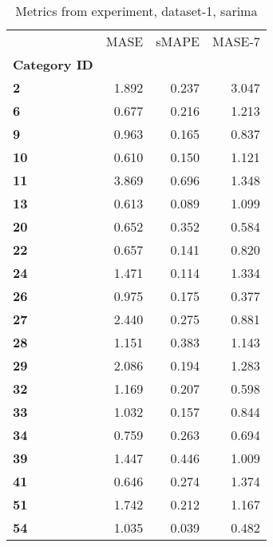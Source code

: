 \begin{table}[h]
\centering
\caption{Metrics from experiment, dataset-1, sarima}
\label{table:sarima-dataset-1}
\begin{tabular}{lrrr}
\toprule
{} &   MASE &  sMAPE &  MASE-7 \\
\textbf{Category ID} &        &        &         \\
\midrule
\textbf{2          } &  1.892 &  0.237 &   3.047 \\
\textbf{6          } &  0.677 &  0.216 &   1.213 \\
\textbf{9          } &  0.963 &  0.165 &   0.837 \\
\textbf{10         } &  0.610 &  0.150 &   1.121 \\
\textbf{11         } &  3.869 &  0.696 &   1.348 \\
\textbf{13         } &  0.613 &  0.089 &   1.099 \\
\textbf{20         } &  0.652 &  0.352 &   0.584 \\
\textbf{22         } &  0.657 &  0.141 &   0.820 \\
\textbf{24         } &  1.471 &  0.114 &   1.334 \\
\textbf{26         } &  0.975 &  0.175 &   0.377 \\
\textbf{27         } &  2.440 &  0.275 &   0.881 \\
\textbf{28         } &  1.151 &  0.383 &   1.143 \\
\textbf{29         } &  2.086 &  0.194 &   1.283 \\
\textbf{32         } &  1.169 &  0.207 &   0.598 \\
\textbf{33         } &  1.032 &  0.157 &   0.844 \\
\textbf{34         } &  0.759 &  0.263 &   0.694 \\
\textbf{39         } &  1.447 &  0.446 &   1.009 \\
\textbf{41         } &  0.646 &  0.274 &   1.374 \\
\textbf{51         } &  1.742 &  0.212 &   1.167 \\
\textbf{54         } &  1.035 &  0.039 &   0.482 \\
\bottomrule
\end{tabular}
\end{table}
